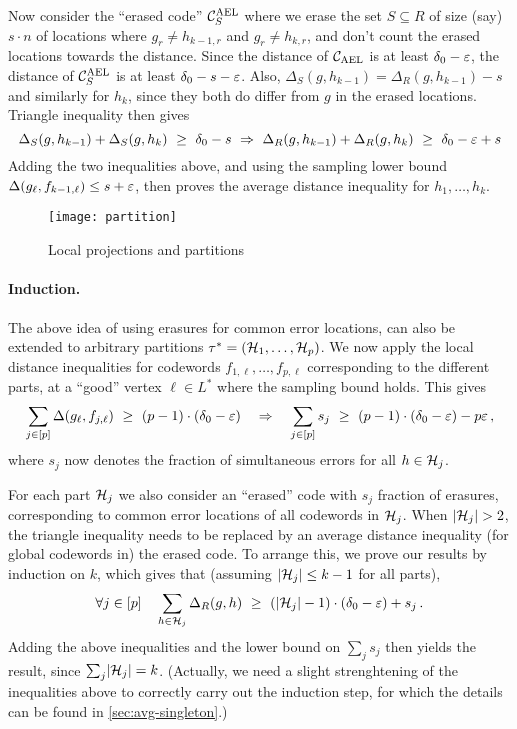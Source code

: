 Now consider the ``erased code'' ${\mathcal C}_S^{\mathrm{AEL}}$ where we erase the set $S \subseteq R$ of size (say) $s
\cdot n$ of locations where $g_{r} \neq h_{k-1, r}$ and $g_r \neq h_{k,r}$, and don't count the
erased locations towards the distance. 
%
Since the distance of ${ {\mathcal C}_{\mathrm{AEL}} }$ is at least $\delta_0 - \varepsilon$, the distance of ${\mathcal C}_S^{\mathrm{AEL}}$ is at least
$\delta_0 - s - \varepsilon$. Also, $\Delta_S(g,h_{k-1}) = \Delta_R(g,h_{k-1}) - s$ and similarly for
$h_k$, since they both do differ from $g$ in the erased locations. Triangle inequality then gives
\[
\Delta_S(g,h_{k-1}) + \Delta_S(g,h_k) ~\geq~ \delta_0 - s ~\Rightarrow~ \Delta_R(g,h_{k-1}) +
\Delta_R(g,h_{k}) ~\geq~ \delta_0 -\varepsilon + s
\]
%
Adding the two inequalities above, and using the sampling lower bound $\Delta(g_{\ell},f_{k-1,\ell}) \leq s +
\varepsilon$, then proves the average distance inequality for $h_1, \ldots, h_k$.
%
\begin{figure}[h]
\centering
\texttt{[image: partition]}
\vspace{-10 pt}
\caption{Local projections and partitions}
\vspace{-10 pt}
\label{fig:partition}
\end{figure}
%
\vspace{-5 pt}
\paragraph{Induction.}
%
The above idea of using erasures for common error locations, can also be extended to arbitrary
partitions $\tau^* = ({\mathcal H}_1, \ldots, {\mathcal H}_p)$. 
%
We now apply the local distance inequalities for codewords $f_{1,\ell}, \ldots, f_{p,\ell}$ corresponding to the different parts, at a ``good'' vertex $\ell \in L^*$ where the sampling bound holds. This gives
%
\[
\sum_{j \in [p]} \Delta(g_{\ell}, f_{j, \ell}) ~\geq~ (p-1) \cdot (\delta_0 - \varepsilon)
\quad \Rightarrow \quad 
\sum_{j \in [p]} s_j ~\geq~ (p-1) \cdot (\delta_0 - \varepsilon) - p \varepsilon \,,
\]
%
where $s_j$ now denotes the fraction of simultaneous errors for all $h \in {\mathcal H}_j$.

For each part ${\mathcal H}_j$ we also consider an ``erased'' code with $s_j$ fraction of erasures, corresponding to common error locations of all codewords in ${\mathcal H}_j$. When $\lvert{\mathcal H}_j\rvert > 2$, the triangle inequality needs to be replaced by an average distance inequality (for global codewords in) the erased code. 
%
To arrange this, we prove our results by induction on $k$, which gives that (assuming $\lvert{\mathcal H}_j\rvert \leq k-1$ for all parts), 
\[
\forall j \in [p] \quad \sum_{h \in {\mathcal H}_j} \Delta_R(g,h) ~\geq~ \left(\lvert{\mathcal H}_j\rvert - 1\right) \cdot (\delta_0 - \varepsilon) + s_j \,.
\]
%
Adding the above inequalities and the lower bound on $\sum_j s_j$ then yields the result, since $\sum_j \lvert{\mathcal H}_j\rvert = k$. (Actually, we need a slight strenghtening of the inequalities above to correctly carry out the induction step, for which the details can be found in \cref{sec:avg-singleton}.)


